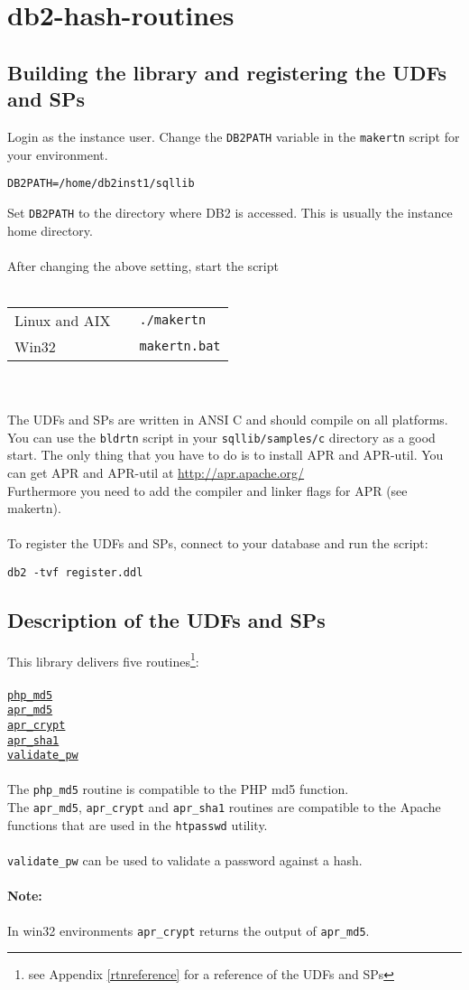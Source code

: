 \section{db2-hash-routines}
\subsection{Building the library and registering the UDFs and SPs}
Login as the instance user. Change the {\tt DB2PATH} variable in the {\tt makertn} script for your environment.
\begin{verbatim}
DB2PATH=/home/db2inst1/sqllib
\end{verbatim}
Set {\tt DB2PATH} to the directory where DB2 is accessed. This is usually the instance home directory.\\
\\
After changing the above setting, start the script\\
\\
\begin{tabular}{@{} lll @{}}
Linux and AIX & & {\tt ./makertn}\\
Win32         & & {\tt makertn.bat}\\
\end{tabular}
\\\\
The UDFs and SPs are written in ANSI C and should compile on all platforms.
You can use the {\tt bldrtn} script in your {\tt sqllib/samples/c} directory as a good start.
The only thing that you have to do is to install APR and \mbox{APR-util}.
You can get APR and APR-util at \url{http://apr.apache.org/} \\
Furthermore you need to add the compiler and linker flags for APR (see makertn).\\
\\
To register the UDFs and SPs, connect to your database and run the script:
\begin{verbatim}
db2 -tvf register.ddl
\end{verbatim}
\newpage
\subsection{Description of the UDFs and SPs}
This library delivers five routines\footnote{see Appendix \ref{rtnreference} for a reference of the UDFs and SPs}:\\
\\
\hyperlink{hphpmd5}{\tt php\_md5}\\
\hyperlink{haprmd5}{\tt apr\_md5}\\
\hyperlink{haprcrypt}{\tt apr\_crypt}\\
\hyperlink{haprsha1}{\tt apr\_sha1}\\
\hyperlink{hvalidatepw}{\tt validate\_pw}\\
\\
The {\tt php\_md5} routine is compatible to the PHP md5 function.\\
The {\tt apr\_md5}, {\tt apr\_crypt} and {\tt apr\_sha1} routines are compatible to the Apache functions that are used in the {\tt htpasswd} utility.\\
\\
{\tt validate\_pw} can be used to validate a password against a hash.
\paragraph{Note:}{In win32 environments {\tt apr\_crypt} returns the output of {\tt apr\_md5}.}